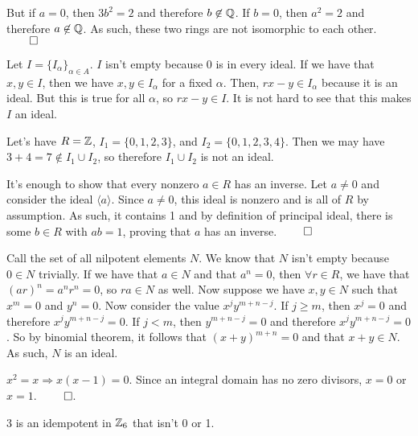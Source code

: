 \documentclass[12pt]{report}
\begin{document}
But if $a=0$, then $3b^2 = 2$ and therefore $b \not\in\QQ$. If $b = 0$, then $a^2 = 2$ and therefore $a \not\in\QQ$. As such, these two rings are not isomorphic to each other. $\qed$

\sol Let $I = \{I_\alpha\}_{\alpha \in A}$. $I$ isn't empty because 0 is in every ideal. If we have that $x,y \in I$, then we have $x,y \in I_\alpha$ for a fixed $\alpha$. Then, $rx -y \in I_\alpha$ because it is an ideal. But this is true for all $\alpha$, so $rx -y \in I$. It is not hard to see that this makes $I$ an ideal. 

Let's have $R = \ZZ$, $I_1 = \{0, 1, 2, 3\}$, and $I_2 = \{0, 1, 2, 3, 4\}$. Then we may have $3+4= 7 \not\in I_1 \cup I_2$, so therefore $I_1 \cup I_2$ is not an ideal.

\sol It's enough to show that every nonzero $a \in R$ has an inverse. Let $a \neq 0$ and consider the ideal $\langle a\rangle$. Since $a\neq 0$, this ideal is nonzero and is all of $R$ by assumption. As such, it contains 1 and by definition of principal ideal, there is some $b \in R$ with $ab = 1$, proving that $a$ has an inverse. $\qed$

\sol Call the set of all nilpotent elements $N$. We know that $N$ isn't empty because $0 \in N$ trivially. If we have that $a \in N$ and that $a^n = 0$, then $\forall r \in R$, we have that $(ar)^n = a^nr^n = 0$, so $ra \in N$ as well. Now suppose we have $x,y \in N$ such that $x^m=0$ and $y^n = 0$. Now consider the value $x^jy^{m+n-j}$. If $j \geq m$, then $x^j = 0$ and therefore $x^jy^{m+n-j} = 0$. If $j < m$, then $y^{m+n-j} = 0$ and therefore $x^jy^{m+n-j} = 0$. So by binomial theorem, it follows that $(x+y)^{m+n} = 0$ and that $x+y \in N$. As such, $N$ is an ideal. 

\sol $x^2 = x \Rightarrow x(x - 1) = 0$. Since an integral domain has no zero divisors, $x =0$ or $x= 1$. $\qed$. 

$3$ is an idempotent in $\ZZ_6$ that isn't 0 or 1. 
\end{document}
